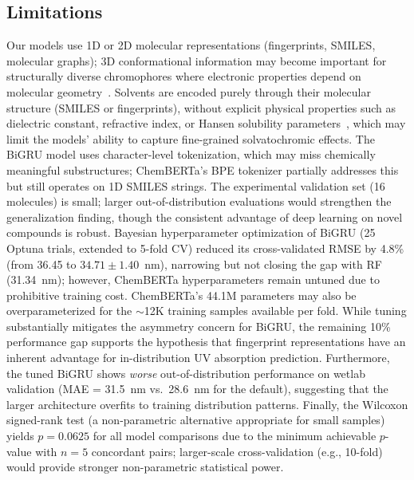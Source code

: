 \documentclass[journal=jcisd8,manuscript=article]{achemso}
\begin{document}
\subsection*{Limitations}
Our models use 1D or 2D molecular representations (fingerprints, SMILES, molecular graphs); 3D conformational information may become important for structurally diverse chromophores where electronic properties depend on molecular geometry~\cite{lupopasini2023excited}.
Solvents are encoded purely through their molecular structure (SMILES or fingerprints), without explicit physical properties such as dielectric constant, refractive index, or Hansen solubility parameters~\cite{reichardt2011solvents}, which may limit the models' ability to capture fine-grained solvatochromic effects.
The BiGRU model uses character-level tokenization, which may miss chemically meaningful substructures; ChemBERTa's BPE tokenizer partially addresses this but still operates on 1D SMILES strings.
The experimental validation set (16 molecules) is small; larger out-of-distribution evaluations would strengthen the generalization finding, though the consistent advantage of deep learning on novel compounds is robust.
Bayesian hyperparameter optimization of BiGRU (25 Optuna trials, extended to 5-fold CV) reduced its cross-validated RMSE by 4.8\% (from 36.45 to $34.71 \pm 1.40$~nm), narrowing but not closing the gap with RF (31.34~nm); however, ChemBERTa hyperparameters remain untuned due to prohibitive training cost.
ChemBERTa's 44.1M parameters may also be overparameterized for the $\sim$12K training samples available per fold.
While tuning substantially mitigates the asymmetry concern for BiGRU, the remaining 10\% performance gap supports the hypothesis that fingerprint representations have an inherent advantage for in-distribution UV absorption prediction.
Furthermore, the tuned BiGRU shows \textit{worse} out-of-distribution performance on wetlab validation (MAE = 31.5~nm vs.\ 28.6~nm for the default), suggesting that the larger architecture overfits to training distribution patterns.
Finally, the Wilcoxon signed-rank test (a non-parametric alternative appropriate for small samples) yields $p = 0.0625$ for all model comparisons due to the minimum achievable $p$-value with $n = 5$ concordant pairs; larger-scale cross-validation (e.g., 10-fold) would provide stronger non-parametric statistical power.
\end{document}
